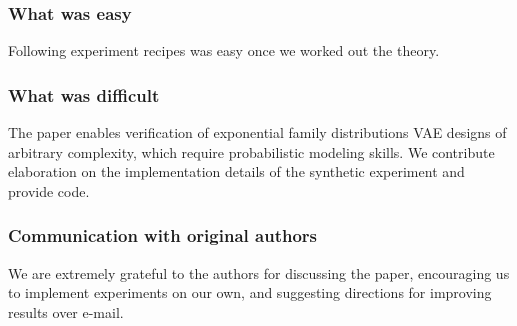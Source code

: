 \subsubsection*{What was easy}

Following experiment recipes was easy once we worked out the theory.


\subsubsection*{What was difficult}

The paper enables verification of exponential family distributions VAE designs of arbitrary complexity, which require probabilistic modeling skills. We contribute elaboration on the implementation details of the synthetic experiment and provide code.

\subsubsection*{Communication with original authors}

We are extremely grateful to the authors for discussing the paper, encouraging us to implement experiments on our own, and suggesting directions for improving results over e-mail.
